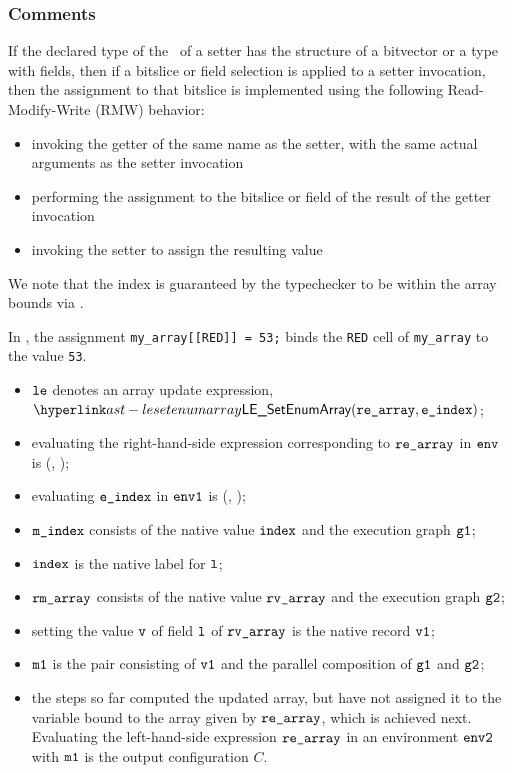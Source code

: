 \subsubsection{Comments}
If the declared type of the \rhsexpression\ of a setter has the structure of a
bitvector or a type with fields, then if a bitslice or field selection is
applied to a setter invocation, then the assignment to that bitslice is
implemented using the following Read-Modify-Write (RMW) behavior:
\begin{itemize}
\item invoking the getter of the same name as the setter, with the same actual
arguments as the setter invocation
\item performing the assignment to the bitslice or field of the result of the
getter invocation
\item invoking the setter to assign the resulting value
\end{itemize}

We note that the index is guaranteed by the typechecker to be within the array bounds
via .

In , the assignment \verb|my_array[[RED]] = 53;| binds the \verb|RED|
cell of
\texttt{my\_array} to the value \texttt{53}.

\ProseParagraph
\AllApply
\begin{itemize}
  \item $\texttt{le}$ denotes an array update expression, $\LESetEnumArray(\rearray, \eindex)$;
  \item evaluating the right-hand-side expression corresponding to $\texttt{re\_array}$ in $\texttt{env}$
  is \Normal(\rmarray, \envone)\ProseOrAbnormal;
  \item evaluating $\texttt{e\_index}$ in $\texttt{env1}$ is \Normal(\mindex, \envtwo)\ProseOrAbnormal;
  \item $\texttt{m\_index}$ consists of the native value $\texttt{index}$ and the execution graph $\texttt{g1}$;
  \item $\texttt{index}$ is the native label for $\texttt{l}$;
  \item $\texttt{rm\_array}$ consists of the native value $\texttt{rv\_array}$ and the execution graph $\texttt{g2}$;
  \item setting the value $\texttt{v}$ of field $\texttt{l}$ of $\texttt{rv\_array}$ is the native record $\texttt{v1}$;
  \item $\texttt{m1}$ is the pair consisting of $\texttt{v1}$ and the parallel composition of $\texttt{g1}$ and $\texttt{g2}$;
  \item the steps so far computed the updated array, but have not assigned it to the variable
  bound to the array given by $\texttt{re\_array}$, which is achieved next.
  Evaluating the left-hand-side expression $\texttt{re\_array}$ in an environment $\texttt{env2}$ with $\texttt{m1}$
  is the output configuration $C$.
\end{itemize}

